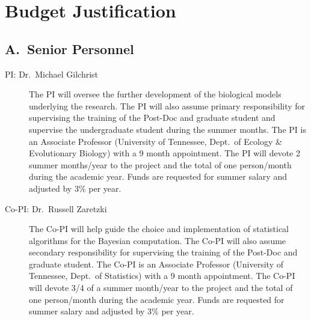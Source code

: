 \documentclass[11pt,fleqn]{article}
\begin{document}
\section*{Budget Justification}
\subsection*{A.~Senior Personnel}
\begin{description}
\item[PI: Dr.~Michael Gilchrist]
The PI  will oversee the further development of the biological models underlying the research.
The PI will also  assume primary responsibility for supervising the training of the Post-Doc and graduate student and supervise the undergraduate student during the summer months.
The PI is an Associate Professor (University of Tennessee, Dept.~of Ecology \& Evolutionary Biology) with a 9 month appointment.
The PI will devote 2 summer months/year to the project and the total of one person/month during the academic year.  
Funds are requested for summer salary and adjusted by 3\% per year.


\item[Co-PI: Dr.~Russell Zaretzki]
The Co-PI will help guide the choice and implementation of statistical algorithms for the Bayesian computation.
The Co-PI will also assume secondary responsibility for supervising the training of the Post-Doc and graduate student.
The Co-PI is an Associate Professor (University of Tennessee, Dept.~of Statistics) with a 9 month appointment.
The Co-PI will devote 3/4 of a summer month/year to the project and the total of one person/month during the academic year.  
Funds are requested for summer salary and adjusted by 3\% per year.
\end{description}
\end{document}
